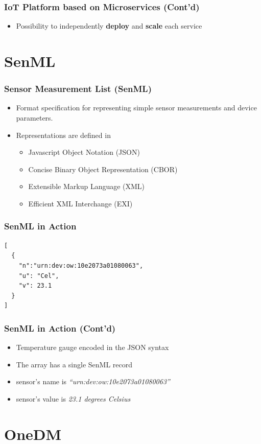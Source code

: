 \documentclass{../iot-lecture}
\begin{document}
\begin{frame}
  \frametitle{IoT Platform based on Microservices (Cont'd)}
  \begin{itemize}
    \item Possibility to independently \textbf{\color{YellowOrange} deploy} and \textbf{\color{LimeGreen} scale} each service
  \end{itemize}
\end{frame}

\section{SenML}

\begin{frame}
  \frametitle{Sensor Measurement List (SenML)}
  \begin{itemize}
    \item Format specification for representing simple sensor measurements and device parameters.
    \item Representations are defined in
    \begin{itemize}
      \item Javascript Object Notation (JSON)
      \item Concise Binary Object Representation (CBOR)
      \item Extensible Markup Language (XML)
      \item Efficient XML Interchange (EXI)
    \end{itemize}
  \end{itemize}
\end{frame}

\begin{frame}[fragile]
  \frametitle{SenML in Action}
  \begin{verbatim}
[
  {
    "n":"urn:dev:ow:10e2073a01080063",
    "u": "Cel",
    "v": 23.1
  }
]
  \end{verbatim}
\end{frame}

\begin{frame}
  \frametitle{SenML in Action (Cont'd)}
  \begin{itemize}
    \item Temperature gauge encoded in the JSON syntax
    \item The array has a single SenML record
    \item sensor's name is \textit{``urn:dev:ow:10e2073a01080063''}
    \item sensor's value is \textit{23.1 degrees Celsius}
  \end{itemize}
\end{frame}

\section{OneDM}

\end{document}
